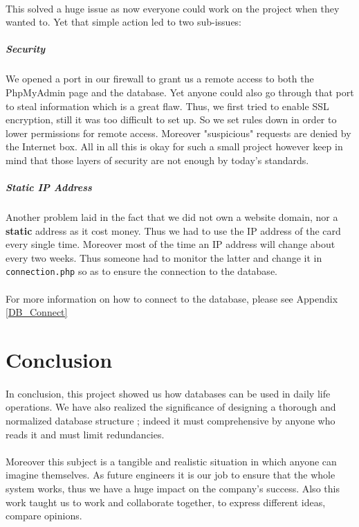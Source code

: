 \documentclass[11pt,a4paper,titlepage]{article}
\begin{document}
\paragraph{}
This solved a huge issue as now everyone could work on the project when they wanted to. Yet that simple action led to two sub-issues:
\subparagraph{Security}
We opened a port in our firewall to grant us a remote access to both the PhpMyAdmin page and the database. Yet anyone could also go through that port to steal information which is a great flaw. Thus, we first tried to enable SSL encryption, still it was too difficult to set up. So we set rules down in order to lower permissions for remote access. Moreover "suspicious" requests are denied by the Internet box. All in all this is okay for such a small project however keep in mind that those layers of security are not enough by today's standards.
\subparagraph{Static IP Address}
Another problem laid in the fact that we did not own a website domain, nor a \textbf{static} address as it cost money. Thus we had to use the IP address of the card every single time. Moreover most of the time an IP address will change about every two weeks. Thus someone had to monitor the latter and change it in \verb|connection.php| so as to ensure the connection to the database. 
\paragraph{}
For more information on how to connect to the database, please see Appendix \ref{DB_Connect}

\newpage
\section{Conclusion}
\paragraph{}
In conclusion, this project showed us how databases can be used in daily life operations. We have also realized the significance of designing a thorough and normalized database structure ; indeed it must comprehensive by anyone who reads it and must limit redundancies. 

\paragraph{}
Moreover this subject is a tangible and realistic situation in which anyone can imagine themselves. As future engineers it is our job to ensure that the whole system works, thus we have a huge impact on the company's success. Also this work taught us to work and collaborate together, to express different ideas, compare opinions.
\end{document}

